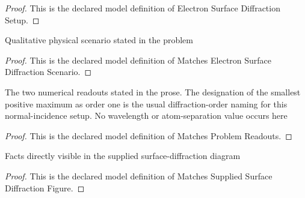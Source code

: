 \begin{proof}
  This is the declared model definition of Electron Surface Diffraction Setup.
\end{proof}
\begin{definition}
  \label{def:physics:phyx-mini-0623:phyxminiproblems-problemphyxmini0623-matcheselectronsurfacediffractionscenario}
  Qualitative physical scenario stated in the problem
\end{definition}
\begin{proof}
  This is the declared model definition of Matches Electron Surface Diffraction Scenario.
\end{proof}
\begin{definition}
  \label{def:physics:phyx-mini-0623:phyxminiproblems-problemphyxmini0623-matchesproblemreadouts}
  The two numerical readouts stated in the prose. The designation of the smallest positive maximum as order one is the usual diffraction-order naming for this normal-incidence setup. No wavelength or atom-separation value occurs here
\end{definition}
\begin{proof}
  This is the declared model definition of Matches Problem Readouts.
\end{proof}
\begin{definition}
  \label{def:physics:phyx-mini-0623:phyxminiproblems-problemphyxmini0623-matchessuppliedsurfacediffractionfigure}
  Facts directly visible in the supplied surface-diffraction diagram
\end{definition}
\begin{proof}
  This is the declared model definition of Matches Supplied Surface Diffraction Figure.
\end{proof}
